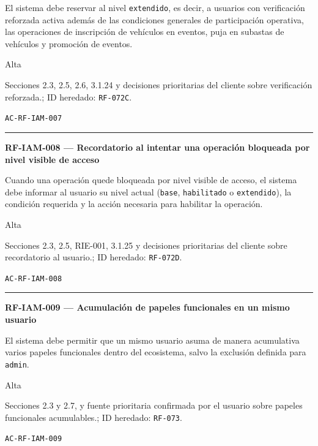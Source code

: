 \documentclass[10pt,letterpaper]{article}
\begin{document}
\begin{description}[style=nextline,leftmargin=3.15cm,labelwidth=2.8cm,font=\normalfont\bfseries]
\item[Obligación] El sistema debe reservar al nivel \texttt{extendido}, es decir, a usuarios con verificación reforzada activa además de las condiciones generales de participación operativa, las operaciones de inscripción de vehículos en eventos, puja en subastas de vehículos y promoción de eventos.
\item[Prioridad] Alta
\item[Procedencia] Secciones 2.3, 2.5, 2.6, 3.1.24 y decisiones prioritarias del cliente sobre verificación reforzada.; ID heredado: \texttt{RF-072C}.
\item[Verificación] \texttt{AC-RF-IAM-007}
\end{description}
\vspace{0.25em}\hrule\vspace{0.65em}
\noindent\textbf{RF-IAM-008 --- Recordatorio al intentar una operación bloqueada por nivel visible de acceso}\par
\begin{description}[style=nextline,leftmargin=3.15cm,labelwidth=2.8cm,font=\normalfont\bfseries]
\item[Obligación] Cuando una operación quede bloqueada por nivel visible de acceso, el sistema debe informar al usuario su nivel actual (\texttt{base}, \texttt{habilitado} o \texttt{extendido}), la condición requerida y la acción necesaria para habilitar la operación.
\item[Prioridad] Alta
\item[Procedencia] Secciones 2.3, 2.5, RIE-001, 3.1.25 y decisiones prioritarias del cliente sobre recordatorio al usuario.; ID heredado: \texttt{RF-072D}.
\item[Verificación] \texttt{AC-RF-IAM-008}
\end{description}
\vspace{0.25em}\hrule\vspace{0.65em}
\noindent\textbf{RF-IAM-009 --- Acumulación de papeles funcionales en un mismo usuario}\par
\begin{description}[style=nextline,leftmargin=3.15cm,labelwidth=2.8cm,font=\normalfont\bfseries]
\item[Obligación] El sistema debe permitir que un mismo usuario asuma de manera acumulativa varios papeles funcionales dentro del ecosistema, salvo la exclusión definida para \texttt{admin}.
\item[Prioridad] Alta
\item[Procedencia] Secciones 2.3 y 2.7, y fuente prioritaria confirmada por el usuario sobre papeles funcionales acumulables.; ID heredado: \texttt{RF-073}.
\item[Verificación] \texttt{AC-RF-IAM-009}
\end{description}
\end{document}

